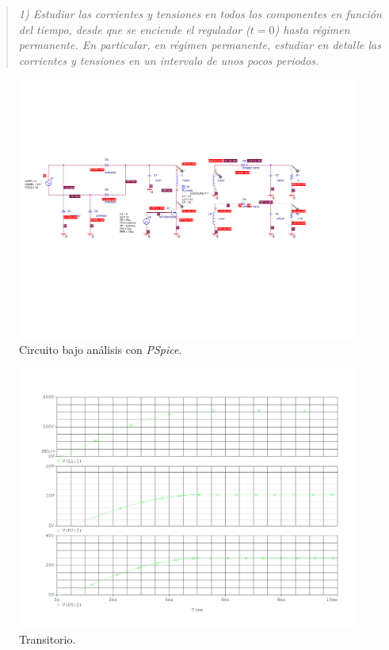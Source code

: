 \begin{quote} \textit{1) Estudiar las corrientes y tensiones en todos los componentes en función del tiempo, desde que se enciende el regulador ($t=0$) hasta régimen permanente. En particular, en régimen permanente, estudiar en detalle las corrientes y tensiones en un intervalo de unos pocos periodos.}
\end{quote}


\begin{figure}[H]
	\centering
	\includegraphics[scale=0.5]{Figuras/1_esquematico.pdf}
	\caption{Circuito bajo análisis con \textit{PSpice}.}
	\label{fig:esq}
\end{figure}


\begin{figure}[H]
	\centering
	\includegraphics[scale=0.5]{Figuras/1_transitorio_con_rectificador.pdf}
	\caption{Transitorio.}
	\label{fig:transitorio}
\end{figure}

